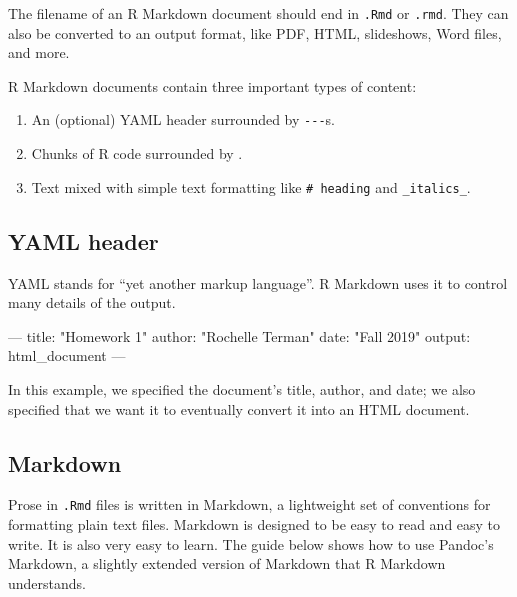 \documentclass[]{book}
\newenvironment{Shaded}{\begin{snugshade}}{\end{snugshade}}
\newcommand{\NormalTok}[1]{#1}
\providecommand{\tightlist}{%
  \setlength{\itemsep}{0pt}\setlength{\parskip}{0pt}}
\begin{document}
The filename of an R Markdown document should end in \texttt{.Rmd} or
\texttt{.rmd}. They can also be converted to an output format, like PDF,
HTML, slideshows, Word files, and more.

R Markdown documents contain three important types of content:

\begin{enumerate}
\def\labelenumi{\arabic{enumi}.}
\tightlist
\item
  An (optional) YAML header surrounded by \texttt{-\/-\/-}s.
\item
  Chunks of R code surrounded by
  \texttt{\textasciigrave{}\textasciigrave{}\textasciigrave{}}.
\item
  Text mixed with simple text formatting like \texttt{\#\ heading} and
  \texttt{\_italics\_}.
\end{enumerate}

\subsection{YAML header}\label{yaml-header}

YAML stands for ``yet another markup language''. R Markdown uses it to
control many details of the output.

\begin{Shaded}
\begin{Highlighting}[]
\NormalTok{---}
\NormalTok{title: "Homework 1"}
\NormalTok{author: "Rochelle Terman"}
\NormalTok{date: "Fall 2019"}
\NormalTok{output: html_document}
\NormalTok{---}
\end{Highlighting}
\end{Shaded}

In this example, we specified the document's title, author, and date; we
also specified that we want it to eventually convert it into an HTML
document.

\subsection{Markdown}\label{markdown}

Prose in \texttt{.Rmd} files is written in Markdown, a lightweight set
of conventions for formatting plain text files. Markdown is designed to
be easy to read and easy to write. It is also very easy to learn. The
guide below shows how to use Pandoc's Markdown, a slightly extended
version of Markdown that R Markdown understands.
\end{document}
